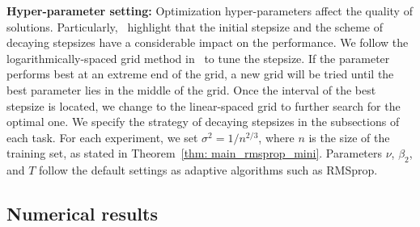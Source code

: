 \documentclass[11pt]{article}
\begin{document}
\textbf{Hyper-parameter setting:} 
Optimization hyper-parameters affect the quality of solutions. 
Particularly,~\citep{Proc:Wilson_NIPS17} highlight that the initial stepsize and the scheme of decaying stepsizes have a considerable impact on the performance. 
We follow the logarithmically-spaced grid method in~\citep{Proc:Wilson_NIPS17} to tune the stepsize. 
If the parameter performs best at an extreme end of the grid, a new grid will be tried until the best parameter lies in the middle of the grid. 
Once the interval of the best stepsize is located, we change to the linear-spaced grid to further search for the optimal one. 
We specify the strategy of decaying stepsizes in the subsections of each task. 
For each experiment, we set $\sigma^2 = 1/n^{2/3}$, where $n$ is the size of the training set, as stated in Theorem~\ref{thm: main_rmsprop_mini}. 
Parameters $\nu$, $\beta_2$, and $T$ follow the default settings as adaptive algorithms such as RMSprop. 

\subsection{Numerical results}\label{subsec:results}
\end{document}
